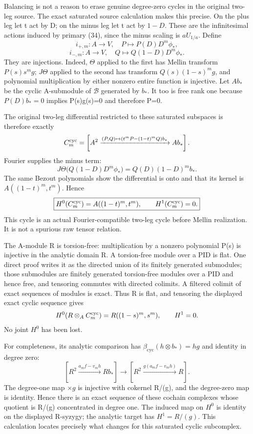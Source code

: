 Balancing is not a reason to erase genuine degree-zero cycles in the original two-leg source. The exact saturated source calculation makes this precise. On the plus leg let t act by D; on the minus leg let t act by \(1-D\). These are the infinitesimal actions induced by primary (34), since the minus scaling is \(aU_{1/a}\). Define \[
i_{+,m}:A\longrightarrow V,\quad
P\longmapsto P(D)D^m\phi_*,
\] \[
i_{-,m}:A\longrightarrow V,\quad
Q\longmapsto Q(1-D)D^m\phi_*.
\] They are injections. Indeed, \(\Theta\) applied to the first has Mellin transform \(P(s)s^mg\); \(J\Theta\) applied to the second has transform \(Q(s)(1-s)^mg\), and polynomial multiplication by either nonzero entire function is injective. Let \(A b_*\) be the cyclic A-submodule of \(\mathscr B\) generated by \(b_*\). It too is free rank one because \(P(D)b_*=0\) implies P(s)g(s)=0 and therefore P=0.

The original two-leg differential restricted to these saturated subspaces is therefore exactly \[
C_m^{\rm cyc}
=\left[A^2\xrightarrow{(P,Q)\mapsto
(t^mP-(1-t)^mQ)b_*}A b_*\right].
\] Fourier supplies the minus term: \[
J\Theta\bigl(Q(1-D)D^m\phi_*\bigr)
=Q(D)(1-D)^m b_*.
\] The same Bezout polynomials show the differential is onto and that its kernel is \(A((1-t)^m,t^m)\). Hence \[
\boxed{H^0(C_m^{\rm cyc})=A((1-t)^m,t^m),\qquad
H^1(C_m^{\rm cyc})=0.}
\] This cycle is an actual Fourier-compatible two-leg cycle before Mellin realization. It is not a spurious raw tensor relation.

The A-module R is torsion-free: multiplication by a nonzero polynomial P(s) is injective in the analytic domain R. A torsion-free module over a PID is flat. One direct proof writes it as the directed union of its finitely generated submodules; those submodules are finitely generated torsion-free modules over a PID and hence free, and tensoring commutes with directed colimits. A filtered colimit of exact sequences of modules is exact. Thus R is flat, and tensoring the displayed exact cyclic sequence gives \[
H^0(R\otimes_A C_m^{\rm cyc})
=R((1-s)^m,s^m),\qquad H^1=0.
\] No joint \(H^0\) has been lost.

For completeness, its analytic comparison has \(\beta_{\mathrm{cyc}}(h\otimes b_*)=hg\) and identity in degree zero: \[
[R^2\xrightarrow{a_m f-v_mh}R b_*]
\longrightarrow
[R^2\xrightarrow{g(a_m f-v_mh)}R].
\] The degree-one map \(\times g\) is injective with cokernel R/(g), and the degree-zero map is identity. Hence there is an exact sequence of these cochain complexes whose quotient is R/(g) concentrated in degree one. The induced map on \(H^0\) is identity on the displayed R-syzygy; the analytic target has \(H^1=R/(g)\). This calculation locates precisely what changes for this saturated cyclic subcomplex.

